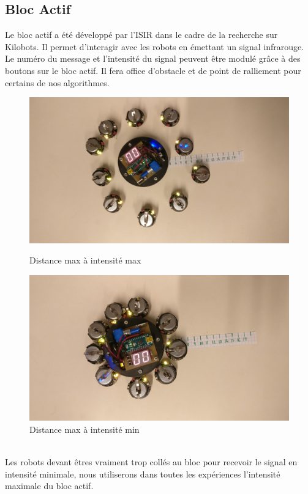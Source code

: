 \documentclass[a4paper]{article}
\begin{document}
\subsection{Bloc Actif}
Le bloc actif a été développé par l'ISIR dans le cadre de la recherche sur Kilobots. Il permet d'interagir avec les robots en émettant un signal infrarouge. Le numéro du message et l'intensité du signal peuvent être modulé grâce à des boutons sur le bloc actif. Il fera office d'obstacle et de point de ralliement pour certains de nos algorithmes.\\
\begin{figure}[h]
	\begin{minipage}[c]{.46\linewidth}
		\centering
		\includegraphics[width=1.1\linewidth]{../../script_results/bloc_actif_max.jpg}
		\caption{Distance max à intensité max}
	\end{minipage}
	\hfill%
	\begin{minipage}[c]{.46\linewidth}
		\centering
		\includegraphics[width=1.1\linewidth]{../../script_results/bloc_actif_min.jpg}
		\caption{Distance max à intensité min}
	\end{minipage}
\end{figure}
\\
Les robots devant êtres vraiment trop collés au bloc pour recevoir le signal en intensité minimale, nous utiliserons dans toutes les expériences l'intensité maximale du bloc actif.
\end{document}
